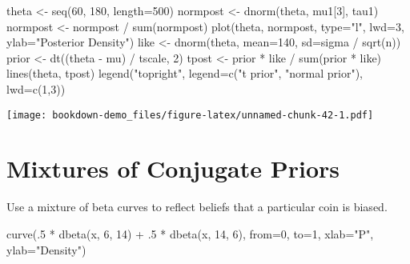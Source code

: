 \documentclass[
]{book}
\newenvironment{Shaded}{\begin{snugshade}}{\end{snugshade}}
\newcommand{\AttributeTok}[1]{\textcolor[rgb]{0.77,0.63,0.00}{#1}}
\newcommand{\DecValTok}[1]{\textcolor[rgb]{0.00,0.00,0.81}{#1}}
\newcommand{\FunctionTok}[1]{\textcolor[rgb]{0.00,0.00,0.00}{#1}}
\newcommand{\NormalTok}[1]{#1}
\newcommand{\OtherTok}[1]{\textcolor[rgb]{0.56,0.35,0.01}{#1}}
\newcommand{\SpecialCharTok}[1]{\textcolor[rgb]{0.00,0.00,0.00}{#1}}
\newcommand{\StringTok}[1]{\textcolor[rgb]{0.31,0.60,0.02}{#1}}
\begin{document}
\begin{Shaded}
\begin{Highlighting}[]
\NormalTok{theta }\OtherTok{\textless{}{-}} \FunctionTok{seq}\NormalTok{(}\DecValTok{60}\NormalTok{, }\DecValTok{180}\NormalTok{, }\AttributeTok{length=}\DecValTok{500}\NormalTok{)}
\NormalTok{normpost }\OtherTok{\textless{}{-}} \FunctionTok{dnorm}\NormalTok{(theta, mu1[}\DecValTok{3}\NormalTok{], tau1)}
\NormalTok{normpost }\OtherTok{\textless{}{-}}\NormalTok{ normpost }\SpecialCharTok{/} \FunctionTok{sum}\NormalTok{(normpost)}
\FunctionTok{plot}\NormalTok{(theta, normpost, }\AttributeTok{type=}\StringTok{"l"}\NormalTok{, }\AttributeTok{lwd=}\DecValTok{3}\NormalTok{,}
     \AttributeTok{ylab=}\StringTok{"Posterior Density"}\NormalTok{)}
\NormalTok{like }\OtherTok{\textless{}{-}} \FunctionTok{dnorm}\NormalTok{(theta, }\AttributeTok{mean=}\DecValTok{140}\NormalTok{, }\AttributeTok{sd=}\NormalTok{sigma }\SpecialCharTok{/} \FunctionTok{sqrt}\NormalTok{(n))}
\NormalTok{prior }\OtherTok{\textless{}{-}} \FunctionTok{dt}\NormalTok{((theta }\SpecialCharTok{{-}}\NormalTok{ mu) }\SpecialCharTok{/}\NormalTok{ tscale, }\DecValTok{2}\NormalTok{)}
\NormalTok{tpost }\OtherTok{\textless{}{-}}\NormalTok{ prior }\SpecialCharTok{*}\NormalTok{ like }\SpecialCharTok{/} \FunctionTok{sum}\NormalTok{(prior }\SpecialCharTok{*}\NormalTok{ like)  }
\FunctionTok{lines}\NormalTok{(theta, tpost)}
\FunctionTok{legend}\NormalTok{(}\StringTok{"topright"}\NormalTok{, }\AttributeTok{legend=}\FunctionTok{c}\NormalTok{(}\StringTok{"t prior"}\NormalTok{, }
                            \StringTok{"normal prior"}\NormalTok{), }
       \AttributeTok{lwd=}\FunctionTok{c}\NormalTok{(}\DecValTok{1}\NormalTok{,}\DecValTok{3}\NormalTok{))}
\end{Highlighting}
\end{Shaded}

\texttt{[image: bookdown-demo\_files/figure-latex/unnamed-chunk-42-1.pdf]}

\hypertarget{mixtures-of-conjugate-priors}{%
\section{Mixtures of Conjugate Priors}\label{mixtures-of-conjugate-priors}}

Use a mixture of beta curves to reflect beliefs that a particular coin is biased.

\begin{Shaded}
\begin{Highlighting}[]
\FunctionTok{curve}\NormalTok{(.}\DecValTok{5} \SpecialCharTok{*} \FunctionTok{dbeta}\NormalTok{(x, }\DecValTok{6}\NormalTok{, }\DecValTok{14}\NormalTok{) }\SpecialCharTok{+}\NormalTok{ .}\DecValTok{5} \SpecialCharTok{*} \FunctionTok{dbeta}\NormalTok{(x, }\DecValTok{14}\NormalTok{, }\DecValTok{6}\NormalTok{),}
      \AttributeTok{from=}\DecValTok{0}\NormalTok{, }\AttributeTok{to=}\DecValTok{1}\NormalTok{, }\AttributeTok{xlab=}\StringTok{"P"}\NormalTok{, }\AttributeTok{ylab=}\StringTok{"Density"}\NormalTok{)}
\end{Highlighting}
\end{Shaded}
\end{document}
